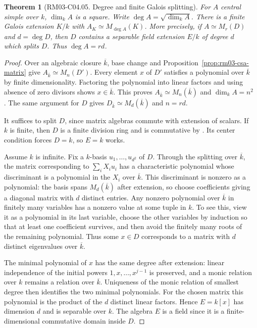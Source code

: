 \documentclass[11pt,oneside,openany]{book}
\newtheorem{theorem}{Theorem}[chapter]
\theoremstyle{definition}
\theoremstyle{remark}
\begin{document}
\begin{theorem}[RM03-C04.05. Degree and finite Galois splitting]
\label{thm:rm03-csa-galois-split}
For \(A\) central simple over \(k\), \(\dim_k A\) is a square.
Write \(\deg A=\sqrt{\dim_k A}\). There is a finite Galois extension
\(K/k\) with \(A_K\simeq M_{\deg A}(K)\).
More precisely, if \(A\simeq M_r(D)\) and \(d=\deg D\), then \(D\)
contains a separable field extension \(E/k\) of degree \(d\) which
splits \(D\). Thus \(\deg A=rd\).
\end{theorem}
\begin{proof}
Over an algebraic closure \(\overline{k}\), base change and
Proposition~\ref{prop:rm03-csa-matrix} give
\(A_{\overline{k}}\simeq M_n(D')\).
Every element \(x\) of \(D'\) satisfies a polynomial over
\(\overline{k}\) by finite dimensionality. Factoring the polynomial
into linear factors and using absence of zero divisors shows
\(x\in\overline{k}\). This proves \(A_{\overline{k}}\simeq
M_n(\overline{k})\) and \(\dim_k A=n^2\). The same argument for \(D\)
gives \(D_{\overline{k}}\simeq M_d(\overline{k})\) and
\(n=rd\).

It suffices to split \(D\), since matrix algebras commute with
extension of scalars. If \(k\) is finite, then \(D\) is a finite
division ring and is commutative by
\cite[K07.23.finite\_division\_ring]{d07}. Its center condition forces
\(D=k\), so \(E=k\) works.

Assume \(k\) is infinite. Fix a \(k\)-basis \(u_1,\ldots,u_{d^2}\)
of \(D\). Through the splitting over \(\overline{k}\), the matrix
corresponding to \(\sum_i X_i u_i\) has a characteristic polynomial
whose discriminant is a polynomial in the \(X_i\) over
\(\overline{k}\). This discriminant is nonzero as a polynomial:
the basis spans \(M_d(\overline{k})\) after extension, so choose
coefficients giving a diagonal matrix with \(d\) distinct entries.
Any nonzero polynomial over \(\overline{k}\) in finitely many
variables has a nonzero value at some tuple in \(k\). To see this,
view it as a polynomial in its last variable, choose the other
variables by induction so that at least one coefficient survives,
and then avoid the finitely many roots of the remaining polynomial.
Thus some \(x\in D\) corresponds to a matrix with \(d\) distinct
eigenvalues over \(\overline{k}\).

The minimal polynomial of \(x\) has the same degree after extension:
linear independence of the initial powers \(1,x,\ldots,x^{j-1}\)
is preserved, and a monic relation over \(k\) remains a relation
over \(\overline{k}\). Uniqueness of the monic relation of smallest
degree then identifies the two minimal polynomials. For the chosen
matrix this polynomial is the product of the \(d\) distinct linear
factors. Hence \(E=k[x]\) has dimension \(d\) and is separable over \(k\).
The algebra \(E\) is a field since it is a finite-dimensional
commutative domain inside \(D\).


\end{proof}
\end{document}

